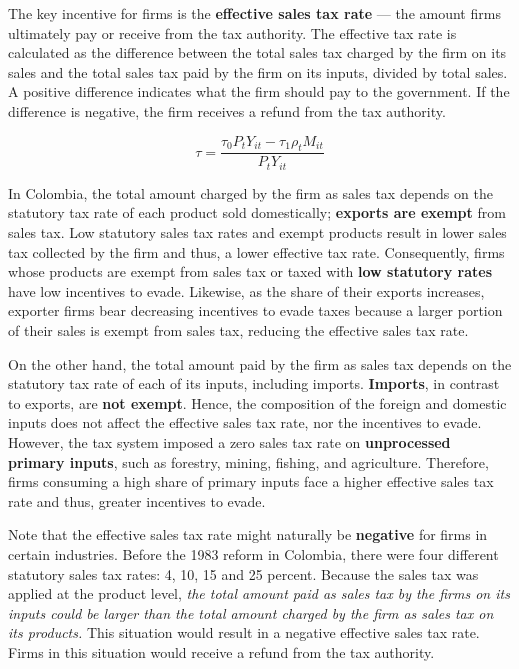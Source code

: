 \documentclass[
  12pt]{article}
\theoremstyle{definition}
\theoremstyle{remark}
\begin{document}
The key incentive for firms is the \textbf{effective sales tax rate} ---
the amount firms ultimately pay or receive from the tax authority. The
effective tax rate is calculated as the difference between the total
sales tax charged by the firm on its sales and the total sales tax paid
by the firm on its inputs, divided by total sales. A positive difference
indicates what the firm should pay to the government. If the difference
is negative, the firm receives a refund from the tax authority.

\[
\tau = \frac{\tau_0P_tY_{it} - \tau_1\rho_t M_{it}}{P_tY_{it}}
\]

In Colombia, the total amount charged by the firm as sales tax depends
on the statutory tax rate of each product sold domestically;
\textbf{exports are exempt} from sales tax. Low statutory sales tax
rates and exempt products result in lower sales tax collected by the
firm and thus, a lower effective tax rate. Consequently, firms whose
products are exempt from sales tax or taxed with \textbf{low statutory
rates} have low incentives to evade. Likewise, as the share of their
exports increases, exporter firms bear decreasing incentives to evade
taxes because a larger portion of their sales is exempt from sales tax,
reducing the effective sales tax rate.

On the other hand, the total amount paid by the firm as sales tax
depends on the statutory tax rate of each of its inputs, including
imports. \textbf{Imports}, in contrast to exports, are \textbf{not
exempt}. Hence, the composition of the foreign and domestic inputs does
not affect the effective sales tax rate, nor the incentives to evade.
However, the tax system imposed a zero sales tax rate on
\textbf{unprocessed primary inputs}, such as forestry, mining, fishing,
and agriculture. Therefore, firms consuming a high share of primary
inputs face a higher effective sales tax rate and thus, greater
incentives to evade.

Note that the effective sales tax rate might naturally be
\textbf{negative} for firms in certain industries. Before the 1983
reform in Colombia, there were four different statutory sales tax rates:
4, 10, 15 and 25 percent. Because the sales tax was applied at the
product level, \emph{the total amount paid as sales tax by the firms on
its inputs could be larger than the total amount charged by the firm as
sales tax on its products.} This situation would result in a negative
effective sales tax rate. Firms in this situation would receive a refund
from the tax authority.
\end{document}
